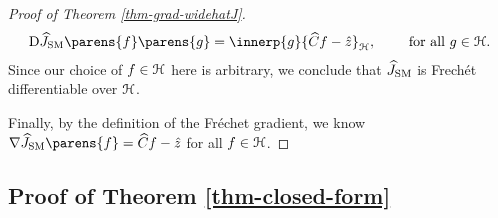 \begin{proof}[Proof of Theorem \ref{thm-grad-widehatJ}]
	\begin{align*}
		\Diff \widehat{J}_{\SM} \parens{f} \parens{g} = \innerp{g}{\widehat{C}f - \hat{z}}_{\calH}, \qquad \text{ for all } g \in \calH. 
	\end{align*}
	Since our choice of $f \in \mathcal{H}$ here is arbitrary, we conclude that $\widehat{J}_{\mathrm{SM}}$ is Frech{\'e}t differentiable over $\mathcal{H}$. 
	
	Finally, by the definition of the Fr{\'e}chet gradient, we know $\nabla \widehat{J}_{\SM} \parens{f} = \widehat{C} f - \hat{z}$ for all $f \in \mathcal{H}$. 
\end{proof}


\subsection{Proof of Theorem \ref{thm-closed-form}}\label{proof-thm-closed-form}


